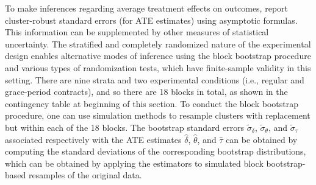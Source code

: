 \documentclass[12pt]{article}
\begin{document}
To make inferences regarding average treatment effects on outcomes, \cite{field2013does} report cluster-robust standard errors (for ATE estimates) using asymptotic formulas. This information can be supplemented by other measures of statistical uncertainty. The stratified and completely randomized nature of the experimental design enables alternative modes of inference using the block bootstrap procedure and various types of randomization tests, which have finite-sample validity in this setting. There are nine strata and two experimental conditions (i.e., regular and grace-period contracts), and so there are 18 blocks in total, as shown in the contingency table at beginning of this section. To conduct the block bootstrap procedure, one can use simulation methods to resample clusters with replacement but within each of the 18 blocks. The bootstrap standard errors $\widetilde{\sigma}_\delta$, $\widetilde{\sigma}_\theta$, and $\widetilde{\sigma}_\tau$ associated respectively with the ATE estimates $\widehat{\delta}$, $\widehat{\theta}$, and $\widehat{\tau}$ can be obtained by computing the standard deviations of the corresponding bootstrap distributions, which can be obtained by applying the estimators to simulated block bootstrap-based resamples of the original data.
\end{document}
